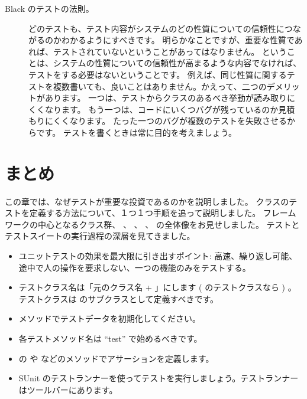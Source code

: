 \documentclass[a4paper,10pt,twoside]{book}
\begin{document}
\begin{description}
\item[Black のテストの法則。]


  どのテストも、テスト内容がシステムのどの性質についての信頼性につながるのかわかるようにすべきです。
  明らかなことですが、重要な性質であれば、テストされていないということがあってはなりません。
  ということは、システムの性質についての信頼性が高まるような内容でなければ、テストをする必要はないということです。
  例えば、同じ性質に関するテストを複数書いても、良いことはありません。かえって、二つのデメリットがあります。
  一つは、テストからクラスのあるべき挙動が読み取りにくくなります。
  もう一つは、コードにいくつバグが残っているのか見積もりにくくなります。
  たった一つのバグが複数のテストを失敗させるからです。
  テストを書くときは常に目的を考えましょう。


\end{description}

\section{まとめ}

この章では、なぜテストが重要な投資であるのかを説明しました。
 クラスのテストを定義する方法について、１つ１つ手順を追って説明しました。
\sunit フレームワークの中心となるクラス群、  、  、  、  の全体像をお見せしました。
テストとテストスイートの実行過程の深層を見てきました。

\begin{itemize}
  \item ユニットテストの効果を最大限に引き出すポイント: 高速、繰り返し可能、 途中で人の操作を要求しない、一つの機能のみをテストする。

  \item テストクラス名は「元のクラス名 +  」にします ( のテストクラスなら ) 。テストクラスは  のサブクラスとして定義すべきです。

  \item {} メソッドでテストデータを初期化してください。

  \item 各テストメソッド名は ``test'' で始めるべきです。

  \item {} の  や  などのメソッドでアサーションを定義します。

  \item SUnit のテストランナーを使ってテストを実行しましょう。テストランナーはツールバーにあります。

\end{itemize}

\ifx\wholebook\relax\else
   
   
\end{document}
